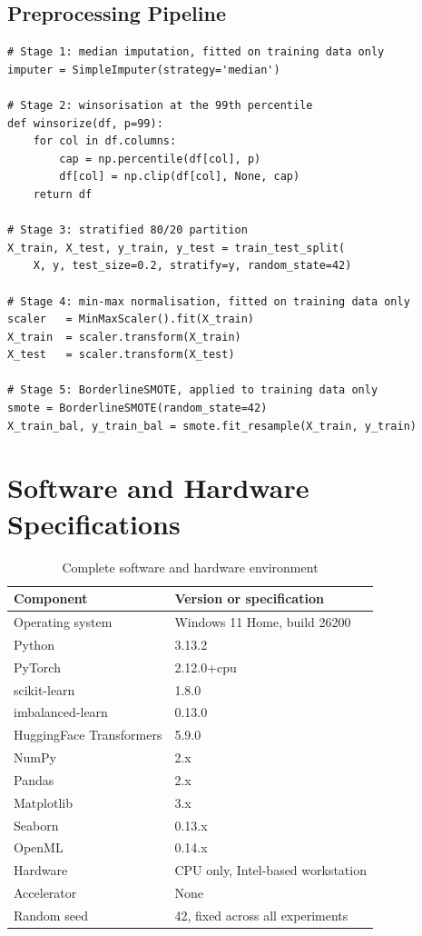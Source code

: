 \documentclass[12pt,a4paper,oneside]{report}
\newcommand{\tabfont}{\fontsize{11}{13}\selectfont\setlength{\tabcolsep}{4pt}}
\begin{document}
\section{Preprocessing Pipeline}

\begin{lstlisting}[caption={Five-stage preprocessing pipeline},label={lst:prep}]
# Stage 1: median imputation, fitted on training data only
imputer = SimpleImputer(strategy='median')

# Stage 2: winsorisation at the 99th percentile
def winsorize(df, p=99):
    for col in df.columns:
        cap = np.percentile(df[col], p)
        df[col] = np.clip(df[col], None, cap)
    return df

# Stage 3: stratified 80/20 partition
X_train, X_test, y_train, y_test = train_test_split(
    X, y, test_size=0.2, stratify=y, random_state=42)

# Stage 4: min-max normalisation, fitted on training data only
scaler   = MinMaxScaler().fit(X_train)
X_train  = scaler.transform(X_train)
X_test   = scaler.transform(X_test)

# Stage 5: BorderlineSMOTE, applied to training data only
smote = BorderlineSMOTE(random_state=42)
X_train_bal, y_train_bal = smote.fit_resample(X_train, y_train)
\end{lstlisting}

\clearpage

\chapter{Software and Hardware Specifications}
\label{app:c}

\begin{table}[H]
\centering
\caption{Complete software and hardware environment}
\label{tab:fullenv}
\tabfont
\begin{tabular}{L{55mm}L{75mm}}
\toprule
\textbf{Component} & \textbf{Version or specification} \\
\midrule
Operating system         & Windows 11 Home, build 26200 \\
Python                   & 3.13.2 \\
PyTorch                  & 2.12.0+cpu \\
scikit-learn             & 1.8.0 \\
imbalanced-learn         & 0.13.0 \\
HuggingFace Transformers & 5.9.0 \\
NumPy                    & 2.x \\
Pandas                   & 2.x \\
Matplotlib               & 3.x \\
Seaborn                  & 0.13.x \\
OpenML                   & 0.14.x \\
Hardware                 & CPU only, Intel-based workstation \\
Accelerator              & None \\
Random seed              & 42, fixed across all experiments \\
\bottomrule
\end{tabular}
\end{table}
\end{document}
